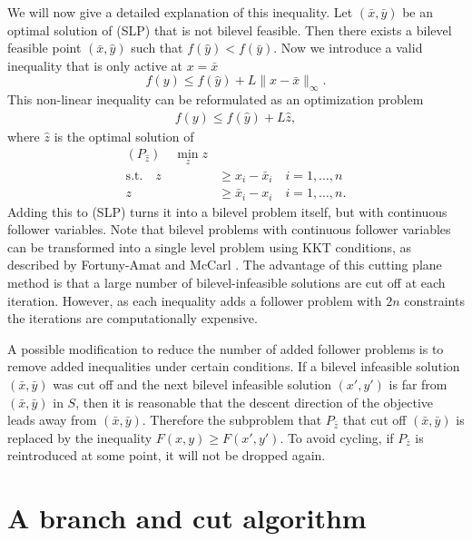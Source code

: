 \documentclass{article}
\begin{document}
We will now give a detailed explanation of this inequality. Let $(\bar x, \bar y)$ be an optimal solution of (SLP) that is not bilevel feasible. Then there exists a bilevel feasible point $(\bar x, \hat y)$ such that $f(\hat y) < f(\bar y)$. Now we introduce a valid inequality that is only active at $x = \bar x$ 
\begin{equation*}
		f(y) \le f(\hat y) + L \|x-\bar x\|_{\infty}.
\end{equation*}
This non-linear inequality can be reformulated as an optimization problem 
\begin{align*}
f(y) \le f(\hat y) + L \hat z, 
\end{align*}
where $\hat z$ is the optimal solution of 
\begin{align*}
(P_{\hat z}) \quad \min_{z} z \\
\text{s.t.} \quad z &\ge x_i - \bar x_i \quad i = 1,\dots,n \\
z &\ge \bar x_i - x_i \quad i = 1,\dots,n.
\end{align*}
Adding this to (SLP) turns it into a bilevel problem itself, but with continuous follower variables.
Note that bilevel problems with continuous follower variables can be transformed into a single level problem using KKT conditions, as described by Fortuny-Amat
and McCarl \cite{Fortuny-Amat1981}.
The advantage of this cutting plane method is that a large number of bilevel-infeasible solutions are cut off at each iteration. However, as each inequality adds a follower problem with $2n$ constraints the iterations are computationally expensive.

A possible modification to reduce the number of added follower problems is to remove added inequalities under certain conditions. If a bilevel infeasible solution $(\bar x, \bar y)$ was cut off and the next bilevel infeasible solution $(x',y')$ is far from  $(\bar x, \bar y)$ in $S$, then it is reasonable that the descent direction of the objective leads away from $(\bar x, \bar y)$.
Therefore the subproblem that $P_{\bar z}$ that cut off $(\bar x, \bar y)$ is replaced by the inequality $F(x,y) \ge F(x',y')$. To avoid cycling, if $P_{\bar z}$ is reintroduced at some point, it will not be dropped again.
\newpage

\section{A branch and cut algorithm}
\end{document}
